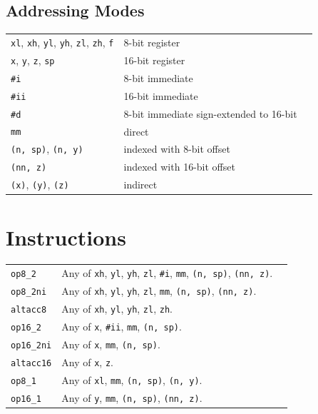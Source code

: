 \documentclass{book}
\begin{document}
\section{Addressing Modes}

\begin{tabular}{l l l}
\texttt{xl}, \texttt{xh}, \texttt{yl}, \texttt{yh}, \texttt{zl}, \texttt{zh}, \texttt{f} & 8-bit register \\
\texttt{x}, \texttt{y}, \texttt{z}, \texttt{sp} & 16-bit register \\
\texttt{\#i} & 8-bit immediate \\
\texttt{\#ii} & 16-bit immediate \\
\texttt{\#d} & 8-bit immediate sign-extended to 16-bit \\
\texttt{mm} & direct \\
\texttt{(n, sp)}, \texttt{(n, y)} & indexed with 8-bit offset \\
\texttt{(nn, z)} & indexed with 16-bit offset \\
\texttt{(x)}, \texttt{(y)}, \texttt{(z)} & indirect
\end{tabular}


\chapter{Instructions}

\begin{tabular}{l l l}
\texttt{op8\_2} & Any of \texttt{xh}, \texttt{yl}, \texttt{yh}, \texttt{zl}, \texttt{\#i}, \texttt{mm}, \texttt{(n, sp)}, \texttt{(nn, z)}. \\
\texttt{op8\_2ni} & Any of \texttt{xh}, \texttt{yl}, \texttt{yh}, \texttt{zl}, \texttt{mm}, \texttt{(n, sp)}, \texttt{(nn, z)}. \\
\texttt{altacc8} & Any of \texttt{xh}, \texttt{yl}, \texttt{yh}, \texttt{zl}, \texttt{zh}. \\
\texttt{op16\_2} & Any of \texttt{x}, \texttt{\#ii}, \texttt{mm}, \texttt{(n, sp)}. \\
\texttt{op16\_2ni} & Any of \texttt{x}, \texttt{mm}, \texttt{(n, sp)}. \\
\texttt{altacc16} & Any of \texttt{x}, \texttt{z}. \\
\texttt{op8\_1} & Any of \texttt{xl}, \texttt{mm}, \texttt{(n, sp)}, \texttt{(n, y)}. \\
\texttt{op16\_1} & Any of \texttt{y}, \texttt{mm}, \texttt{(n, sp)}, \texttt{(nn, z)}. \\
\end{tabular}
\end{document}
